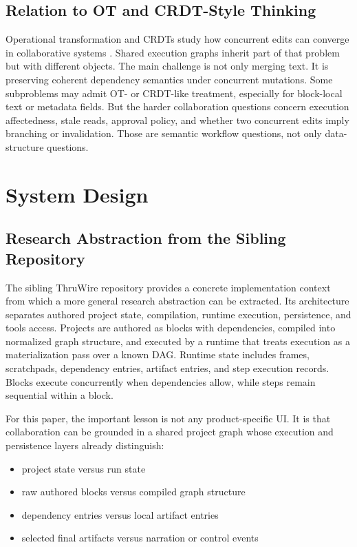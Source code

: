 \documentclass{article}
\begin{document}
\subsection{Relation to OT and CRDT-Style Thinking}

Operational transformation and CRDTs study how concurrent edits can converge in collaborative systems \cite{ellis1989groupware,shapiro2011crdt}. Shared execution graphs inherit part of that problem but with different objects. The main challenge is not only merging text. It is preserving coherent dependency semantics under concurrent mutations. Some subproblems may admit OT- or CRDT-like treatment, especially for block-local text or metadata fields. But the harder collaboration questions concern execution affectedness, stale reads, approval policy, and whether two concurrent edits imply branching or invalidation. Those are semantic workflow questions, not only data-structure questions.

\section{System Design}

\subsection{Research Abstraction from the Sibling Repository}

The sibling ThruWire repository provides a concrete implementation context from which a more general research abstraction can be extracted. Its architecture separates authored project state, compilation, runtime execution, persistence, and tools access. Projects are authored as blocks with dependencies, compiled into normalized graph structure, and executed by a runtime that treats execution as a materialization pass over a known DAG. Runtime state includes frames, scratchpads, dependency entries, artifact entries, and step execution records. Blocks execute concurrently when dependencies allow, while steps remain sequential within a block.

For this paper, the important lesson is not any product-specific UI. It is that collaboration can be grounded in a shared project graph whose execution and persistence layers already distinguish:
\begin{itemize}
\item project state versus run state
\item raw authored blocks versus compiled graph structure
\item dependency entries versus local artifact entries
\item selected final artifacts versus narration or control events
\end{itemize}
\end{document}
